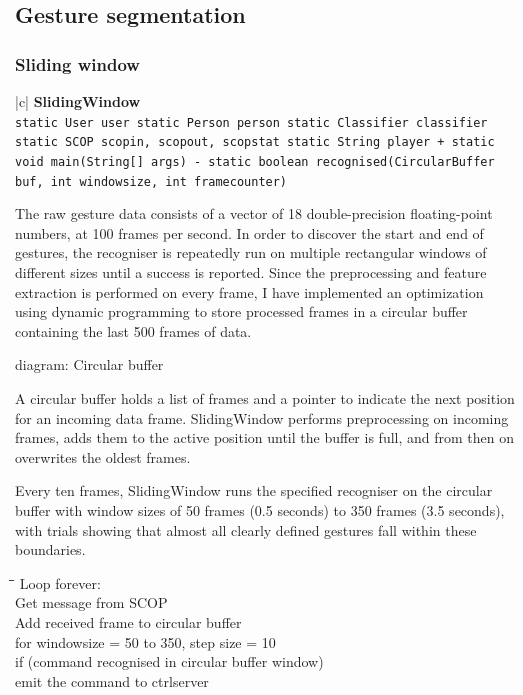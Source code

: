 \documentclass[12pt,a4,notitlepage]{report}
\renewcommand{\_}{\texttt{\symbol{95}}}
\newcommand{\<}{\texttt{\symbol{60}}}
\renewcommand{\>}{\texttt{\symbol{62}}}
\newcommand{\class}[1]{\textbf{#1}}
\newcommand{\variable}[1]{\texttt{#1}}
\newenvironment{pseudocode}{\begin{slshape}\begin{tabbing}\hspace*{0.5cm}\=\hspace*{0.5cm}\=\hspace*{0.5cm}\= \kill }{\end{tabbing}\end{slshape}}
\begin{document}
\subsection{Gesture segmentation}

\subsubsection{Sliding window}

\begin{tabular}{|c|} \hline 
\class{SlidingWindow} \\ \hline
{}
{ \variable{static User user \newline
static Person person \newline
static Classifier classifier \newline
static SCOP scopin, scopout, scopstat \newline
static String player \newline
+ static void main(String[] args) \newline
- static boolean recognised(CircularBuffer buf, int windowsize,	int framecounter)
} } \\ \hline
\end{tabular}

The raw gesture data consists of a vector of 18 double-precision floating-point numbers, at 100 frames per second. In order to discover the start and end of gestures, the recogniser is repeatedly run on multiple rectangular windows of different sizes until a success is reported. Since the preprocessing and feature extraction is performed on every frame, I have implemented an optimization using dynamic programming to store processed frames in a circular buffer containing the last 500 frames of data.

{diagram: Circular buffer}

A circular buffer holds a list of frames and a pointer to indicate the next position for an incoming data frame. SlidingWindow performs preprocessing on  incoming frames, adds them to the active position until the buffer is full, and from then on overwrites the oldest frames.

Every ten frames, SlidingWindow runs the specified recogniser on the circular buffer with window sizes of 50 frames (0.5 seconds) to 350 frames (3.5 seconds), with trials showing that almost all clearly defined gestures fall within these boundaries.

\begin{pseudocode}
Loop forever: \\
\>	Get message from SCOP \\
\>	Add received frame to circular buffer \\
\>\>    for windowsize = 50 to 350, step size = 10 \\
\>\>        if (command recognised in circular buffer window) \\
\>\>\>           emit the command to ctrlserver
\end{pseudocode}
\end{document}
